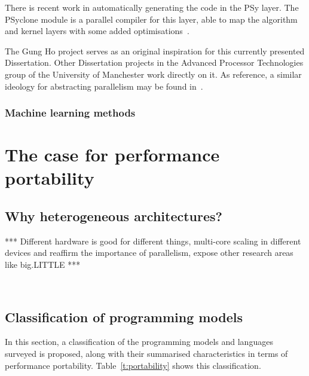 There is recent work in automatically generating the code in the PSy layer. The PSyclone module is a parallel compiler for this layer, able to map the algorithm and kernel layers with some added optimisations~\cite{9_puma.nerc.ac.uk_2015}.

The Gung Ho project serves as an original inspiration for this currently presented Dissertation. Other Dissertation projects in the Advanced Processor Technologies group of the University of Manchester work directly on it. As reference, a similar ideology for abstracting parallelism may be found in~\cite{Kelly}.




\subsubsection{Machine learning methods}



\section{The case for performance portability}

\subsection{Why heterogeneous architectures?}

*** Different hardware is good for different things, multi-core scaling in different devices and reaffirm the importance of parallelism, expose other research areas like big.LITTLE ***

~\cite{daga2011efficacy}
~\cite{zhu2013high}
~\cite{AMD2011}

\subsection{Classification of programming models}

In this section, a classification of the programming models and languages surveyed is proposed, along with their summarised characteristics in terms of performance portability. Table~\ref{t:portability} shows this classification.

